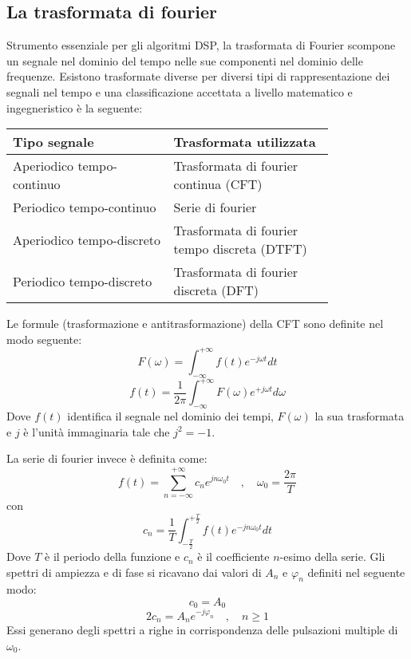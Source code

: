 \subsection{La trasformata di fourier}
Strumento essenziale per gli algoritmi DSP, la trasformata di Fourier scompone un segnale nel dominio del tempo nelle sue componenti nel dominio delle frequenze. Esistono trasformate diverse per diversi tipi di rappresentazione dei segnali nel tempo e una classificazione accettata a livello matematico e ingegneristico\cite{dspguide} è la seguente:

\begin{center}
\begin{small}
\begin{tabular}{p{0.4\linewidth} p{0.4\linewidth}}
    Tipo segnale & Trasformata utilizzata \\
    \hline
    Aperiodico tempo-continuo & Trasformata di fourier continua (CFT) \\
    Periodico tempo-continuo & Serie di fourier \\
    Aperiodico tempo-discreto & Trasformata di fourier tempo discreta (DTFT) \\
    Periodico tempo-discreto & Trasformata di fourier discreta (DFT)
\end{tabular}
\end{small}
\end{center}

\medskip

Le formule (trasformazione e antitrasformazione) della CFT sono definite nel modo seguente\cite{calandrino}:
\begin{equation}
    {F}(\omega) = \int_{-\infty}^{+\infty} f(t){e}^{-j \omega t} dt
\end{equation}
\begin{equation}
    {f}(t) = \frac{1}{2\pi}\int_{-\infty}^{+\infty} F(\omega){e}^{+j \omega t} d\omega
\end{equation}
Dove $f(t)$ identifica il segnale nel dominio dei tempi, $F(\omega)$ la sua trasformata e $j$ è l'unità immaginaria tale che $j^2 = -1$.

La serie di fourier invece è definita come\cite{calandrino}:
\begin{equation}
    {f}(t) = \displaystyle\sum_{n=-\infty}^{+\infty} c_n e^{jn \omega_0 t} \quad, \quad \omega_0 = \frac{2\pi}{T}
\end{equation}
con
\begin{equation}
    c_n = \frac{1}{T}\int_{-\frac{T}{2}}^{+\frac{T}{2}}f(t)e^{-jn \omega_0 t} dt
\end{equation}
Dove $T$ è il periodo della funzione e $c_n$ è il coefficiente $n$-esimo della serie. Gli spettri di ampiezza e di fase si ricavano dai valori di $A_n$ e $\varphi_n$ definiti nel seguente modo:
\begin{equation}
    c_0 = A_0
\end{equation}
\begin{equation}
    2 c_n = A_n e^{-j\varphi_n} \quad,\quad n \geq 1
\end{equation}
Essi generano degli spettri a righe in corrispondenza delle pulsazioni multiple di $\omega_0$.

